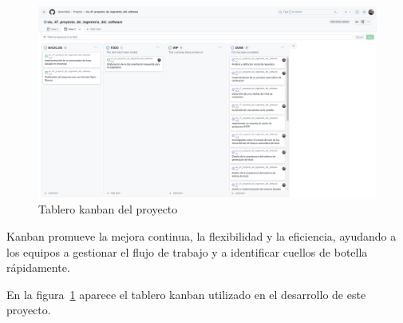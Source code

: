 \begin{figure}[ht]
    \begin{center}
        \includegraphics[width=\textwidth]{./chapter/3/images/chapter_3.kanban}
        \caption{Tablero kanban del proyecto}
        \label{fig:chapter_3.kanban}
    \end{center}
\end{figure}

Kanban promueve la mejora continua, la flexibilidad y la eficiencia, ayudando a los equipos a gestionar el flujo de
trabajo y a identificar cuellos de botella rápidamente.

En la figura~\ref{fig:chapter_3.kanban} aparece el tablero kanban utilizado en el desarrollo de este proyecto.


